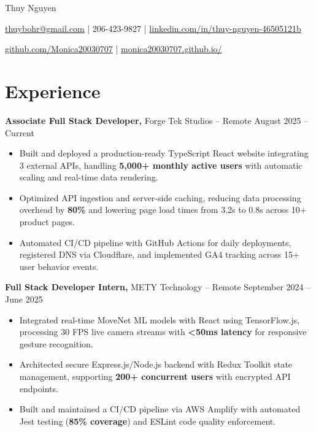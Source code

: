 \documentclass[11pt]{article}
\begin{document}
\centerline{\Huge Thuy Nguyen}

\vspace{5pt}

\centerline{\href{mailto:thuybohr@gmail.com}{thuybohr@gmail.com} | 206-423-9827 |
\href{https://www.linkedin.com/in/thuy-nguyen-46505121b/}{linkedin.com/in/thuy-nguyen-46505121b}}

\centerline{\href{https://github.com/Monica20030707}{github.com/Monica20030707} |
\href{https://monica20030707.github.io/}{monica20030707.github.io/}}

\vspace{-9pt}

\section*{Experience}

\textbf{Associate Full Stack Developer,} {Forge Tek Studios} -- Remote \hfill August 2025 -- Current
\vspace{-9pt}
\begin{itemize}
  \item Built and deployed a production-ready TypeScript React website integrating 3 external APIs, handling \textbf{5,000+ monthly active users} with automatic scaling and real-time data rendering.
  \item Optimized API ingestion and server-side caching, reducing data processing overhead by \textbf{80\%} and lowering page load times from 3.2s to 0.8s across 10+ product pages.
  \item Automated CI/CD pipeline with GitHub Actions for daily deployments, registered DNS via Cloudflare, and implemented GA4 tracking across 15+ user behavior events.
\end{itemize}

\textbf{Full Stack Developer Intern,} {METY Technology} -- Remote \hfill September 2024 -- June 2025
\vspace{-9pt}
\begin{itemize}
  \item Integrated real-time MoveNet ML models with React using TensorFlow.js, processing 30 FPS live camera streams with \textbf{<50ms latency} for responsive gesture recognition.
  \item Architected secure Express.js/Node.js backend with Redux Toolkit state management, supporting \textbf{200+ concurrent users} with encrypted API endpoints.
  \item Built and maintained a CI/CD pipeline via AWS Amplify with automated Jest testing (\textbf{85\% coverage}) and ESLint code quality enforcement.
\end{itemize}
\end{document}
